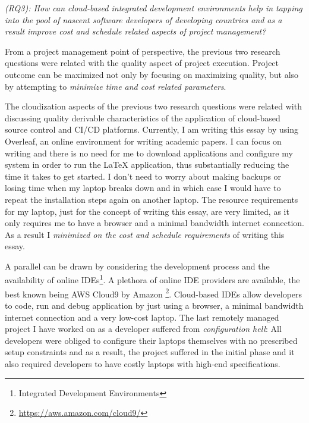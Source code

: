 \documentclass[a4paper, 10pt, conference]{ieeeconf}
\begin{document}
\vspace{3 mm}

\textit{(RQ3): How can cloud-based integrated development environments help in tapping into the pool of nascent software developers of developing countries and as a result improve cost and schedule related aspects of project management?}

\vspace{3 mm}

From a project management point of perspective, the previous two research questions were related with the quality aspect of project execution. Project outcome can be maximized not only by focusing on maximizing quality, but also by attempting to \textit{minimize time and cost related parameters}. 

\vspace{3 mm}

The cloudization aspects of the previous two research questions were related with discussing quality derivable characteristics of the application of cloud-based source control and CI/CD platforms. Currently, I am writing this essay by using Overleaf, an online environment for writing academic papers. I can focus on writing and there is no need for me to download applications and configure my system in order to run the LaTeX application, thus substantially reducing the time it takes to get started. I don't need to worry about making backups or losing time when my laptop breaks down and in which case I would have to repeat the installation steps again on another laptop. The resource requirements for my laptop, just for the concept of writing this essay, are very limited, as it only requires me to have a browser and a minimal bandwidth internet connection. As a result I \textit{minimized on the cost and schedule requirements} of writing this essay.

\vspace{3 mm}

A parallel can be drawn by considering the development process and the availability of online IDEs\footnote{Integrated Development Environments}. A plethora of online IDE providers are available, the best known being AWS Cloud9 by Amazon \footnote{\url{https://aws.amazon.com/cloud9/}}. Cloud-based IDEs allow developers to code, run and debug application by just using a browser, a minimal bandwidth internet connection and a very low-cost laptop. The last remotely managed project I have worked on as a developer suffered from \textit{configuration hell}: All developers were obliged to configure their laptops themselves with no prescribed setup constraints and as a result, the project suffered in the initial phase and it also required developers to have costly laptops with high-end specifications.
\end{document}
